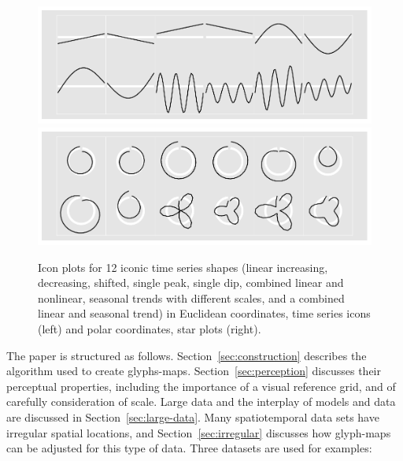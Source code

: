 \documentclass[oneside]{article}
\begin{document}
\begin{figure}[htbp]
  \centering
  \includegraphics[width=0.5\linewidth]{euclid-to-polar-1}%
  \includegraphics[width=0.5\linewidth]{euclid-to-polar-2}

  \caption{Icon plots for 12 iconic time series shapes (linear increasing, decreasing, shifted, single peak, single dip, combined linear and nonlinear, seasonal trends with different scales, and a combined linear and seasonal trend) in Euclidean coordinates, time series icons (left) and polar coordinates, star plots (right).}
  \label{fig:templates}
\end{figure}



The paper is structured as follows. Section~\ref{sec:construction} describes the algorithm used to create glyphs-maps. Section~\ref{sec:perception} discusses their perceptual properties, including the importance of a visual reference grid, and of carefully consideration of scale. Large data and the interplay of models and data are discussed in Section~\ref{sec:large-data}. Many spatiotemporal data sets have irregular spatial locations, and Section~\ref{sec:irregular} discusses how glyph-maps can be adjusted for this type of data. Three datasets are used for examples:
\end{document}
